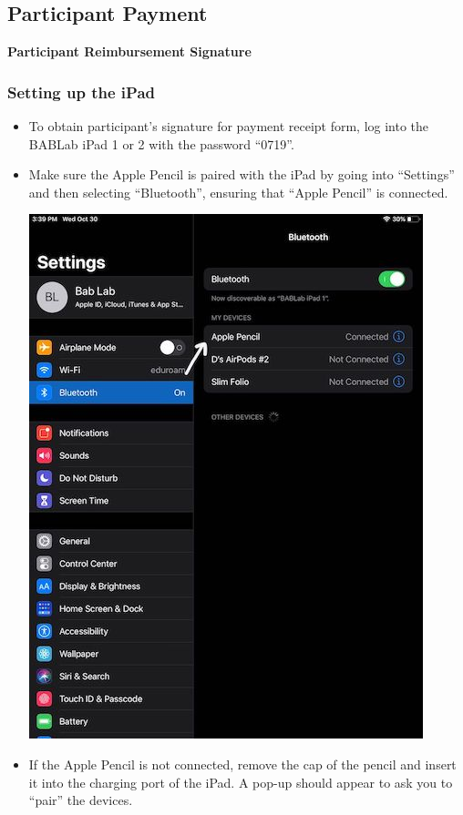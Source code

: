 \documentclass[]{book}
\begin{document}
\hypertarget{participant-payment}{%
\subsection{Participant Payment}\label{participant-payment}}

\textbf{Participant Reimbursement Signature}

\hypertarget{setting-up-the-ipad}{%
\subsubsection{Setting up the iPad}\label{setting-up-the-ipad}}

\begin{itemize}
\item
  To obtain participant's signature for payment receipt form, log into the BABLab iPad 1 or 2 with the password ``0719''.
\item
  Make sure the Apple Pencil is paired with the iPad by going into ``Settings'' and then selecting ``Bluetooth'', ensuring that ``Apple Pencil'' is connected.

  \includegraphics{images/payment/1.jpeg}
\item
  If the Apple Pencil is not connected, remove the cap of the pencil and insert it into the charging port of the iPad. A pop-up should appear to ask you to ``pair'' the devices.


\end{itemize}
\end{document}
